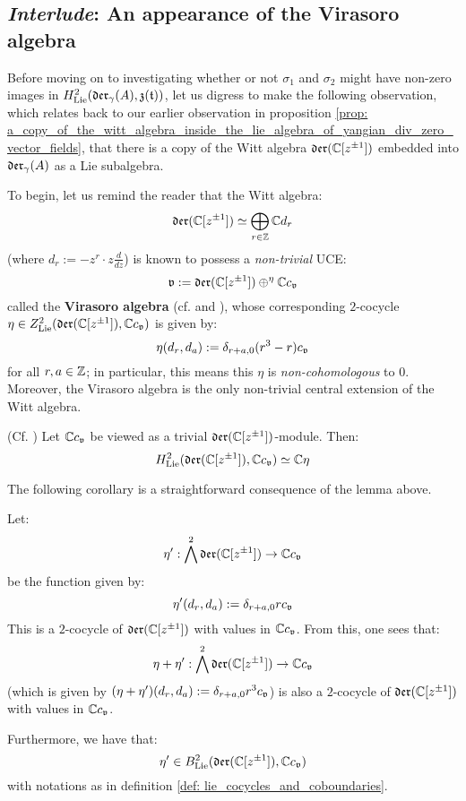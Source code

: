    \subsection{\textit{Interlude}: An appearance of the Virasoro algebra}
        Before moving on to investigating whether or not $\sigma_1$ and $\sigma_2$ might have non-zero images in $H^2_{\mathrm{Lie}}(\mathfrak{der}_{\gamma}(A), \mathfrak{z}(\mathfrak{t}))$, let us digress to make the following observation, which relates back to our earlier observation in proposition \ref{prop: a_copy_of_the_witt_algebra_inside_the_lie_algebra_of_yangian_div_zero_vector_fields}, that there is a copy of the Witt algebra $\mathfrak{der}(\mathbb{C}[z^{\pm 1}])$ embedded into $\mathfrak{der}_{\gamma}(A)$ as a Lie subalgebra.
        
        To begin, let us remind the reader that the Witt algebra:
            $$\mathfrak{der}(\mathbb{C}[z^{\pm 1}]) \simeq \bigoplus_{r \in \mathbb{Z}} \mathbb{C} d_r$$
        (where $d_r := -z^r \cdot z\frac{d}{dz}$) is known to possess a \textit{non-trivial} UCE:
            $$\mathfrak{v} := \mathfrak{der}(\mathbb{C}[z^{\pm 1}]) \oplus^{\eta} \mathbb{C} c_{\mathfrak{v}}$$
        called the \textbf{Virasoro algebra} (cf. \cite[Sections 9.13 and 9.14]{kac_infinite_dimensional_lie_algebras} and \cite[Section 1.3]{kac_raina_rozhkovskaya_bombay_lectures_on_highest_weight_modules_of_infinite_dimensional_lie_algebras}), whose corresponding $2$-cocycle $\eta \in Z^2_{\mathrm{Lie}}( \mathfrak{der}(\mathbb{C}[z^{\pm 1}]), \mathbb{C} c_{\mathfrak{v}} )$ is given by:
            $$\eta(d_r, d_a) := \delta_{r + a, 0} (r^3 - r) c_{\mathfrak{v}}$$
        for all $r, a \in \mathbb{Z}$; in particular, this means this $\eta$ is \textit{non-cohomologous} to $0$. Moreover, the Virasoro algebra is the only non-trivial central extension of the Witt algebra.
        \begin{lemma} \label{lemma: H^2_of_witt_algebra}
            (Cf. \cite[Proposition 1.3]{kac_raina_rozhkovskaya_bombay_lectures_on_highest_weight_modules_of_infinite_dimensional_lie_algebras}) Let $\mathbb{C} c_{\mathfrak{v}}$ be viewed as a trivial $\mathfrak{der}(\mathbb{C}[z^{\pm 1}])$-module. Then:
                $$H^2_{\mathrm{Lie}}( \mathfrak{der}(\mathbb{C}[z^{\pm 1}]), \mathbb{C} c_{\mathfrak{v}} ) \simeq \mathbb{C} \eta$$
        \end{lemma}
        The following corollary is a straightforward consequence of the lemma above.
        \begin{corollary} \label{coro: a_virasoro_coboundary}
            Let:
                $$\eta': \bigwedge^2 \mathfrak{der}(\mathbb{C}[z^{\pm 1}]) \to \mathbb{C} c_{\mathfrak{v}}$$
            be the function given by:
                $$\eta'(d_r, d_a) := \delta_{r + a, 0} r c_{\mathfrak{v}}$$
            This is a $2$-cocycle of $\mathfrak{der}(\mathbb{C}[z^{\pm 1}])$ with values in $\mathbb{C} c_{\mathfrak{v}}$. From this, one sees that:
                $$\eta + \eta': \bigwedge^2 \mathfrak{der}(\mathbb{C}[z^{\pm 1}]) \to \mathbb{C} c_{\mathfrak{v}}$$
            (which is given by $(\eta + \eta')(d_r, d_a) := \delta_{r + a, 0} r^3 c_{\mathfrak{v}}$) is also a $2$-cocycle of $\mathfrak{der}(\mathbb{C}[z^{\pm 1}])$ with values in $\mathbb{C} c_{\mathfrak{v}}$. 

            Furthermore, we have that:
                $$\eta' \in B^2_{\mathrm{Lie}}( \mathfrak{der}(\mathbb{C}[z^{\pm 1}]), \mathbb{C} c_{\mathfrak{v}} )$$
            with notations as in definition \ref{def: lie_cocycles_and_coboundaries}.
        \end{corollary}

